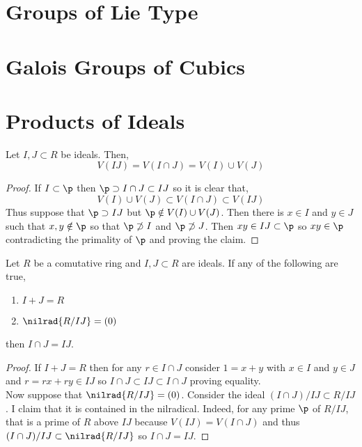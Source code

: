\documentclass[12pt]{article}
\begin{document}
\tableofcontents

\section{Groups of Lie Type}

\section{Galois Groups of Cubics}

\section{Products of Ideals}

\begin{lemma}
Let $I, J \subset R$ be ideals. Then,
\[ V(IJ) = V(I \cap J) = V(I) \cup V(J) \]
\end{lemma}

\begin{proof}
If $I \subset \p$ then $\p \supset I \cap J \subset IJ$ so it is clear that,
\[ V(I) \cup V(J) \subset V(I \cap J) \subset V(IJ) \]
Thus suppose that $\p \supset IJ$ but $\p \notin V(I) \cup V(J)$. Then there is $x \in I$ and $y \in J$ such that $x, y \notin \p$ so that $\p \not\supset I$ and $\p \not \supset J$. Then $x y \in IJ \subset \p$ so $x y \in \p$ contradicting the primality of $\p$ and proving the claim.
\end{proof}

\begin{prop}
Let $R$ be a comutative ring and $I, J \subset R$ are ideals.
If any of the following are true,
\begin{enumerate}
\item $I + J = R$
\item $\nilrad{R / IJ} = (0)$
\end{enumerate}
then $I \cap J = IJ$.
\end{prop}

\begin{proof}
If $I + J = R$ then for any $r \in I \cap J$ consider $1 = x + y$ with $x \in I$ and $y \in J$ and $r = r x + ry \in IJ$ so $I \cap J \subset IJ \subset I \cap J$ proving equality. 
\bigskip\\
Now suppose that $\nilrad{R / IJ} = (0)$. Consider the ideal $(I \cap J)/IJ \subset R / IJ$. I claim that it is contained in the nilradical. Indeed, for any prime $\p$ of $R / IJ$, that is a prime of $R$ above $IJ$ because $V(IJ) = V(I \cap J)$ and thus $(I \cap J)/IJ \subset \nilrad{R / IJ}$ so $I \cap J = IJ$.
\end{proof}
\end{document}
